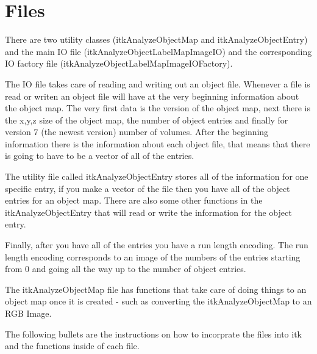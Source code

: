 \documentclass{InsightArticle}
\begin{document}
\section{Files}
There are two utility classes (itkAnalyzeObjectMap and itkAnalyzeObjectEntry) and the main IO file (itkAnalyzeObjectLabelMapImageIO) and the corresponding
IO factory file (itkAnalyzeObjectLabelMapImageIOFactory).

The IO file takes care of reading and writing out an object file.  Whenever
a file is read or writen an object file will have at the very beginning information about the object map.  The very first data is the version
of the object map, next there is the x,y,z size of the object map, the number of object entries and finally for version 7 (the newest
version) number of volumes.  After the beginning information there is the information about each object file, that means that
there is going to have to be a vector of all of the entries.  

The utility file called itkAnalyzeObjectEntry stores all of the
information for one specific entry, if you make a vector of the file then you have all of the object entries for an object map.  There
are also some other functions in the itkAnalyzeObjectEntry that will read or write the information for the object entry.  

Finally, after you have all of the entries you have a run length encoding.  The run length encoding corresponds to an image of the numbers of the entries starting from 0 and going all the way up to the number of object entries.  

The itkAnalyzeObjectMap file has functions that take care of doing things to an object map once it is created - such as converting the itkAnalyzeObjectMap to an RGB Image. 

The following bullets are the instructions on how to incorprate the files into itk and the functions inside of each file.
\end{document}
